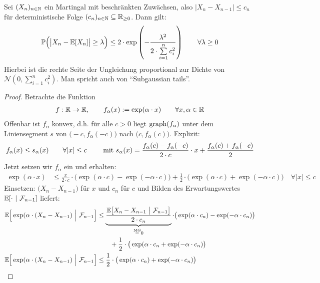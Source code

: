\begin{theorem}\label{theorem5.4AzumasUngleichung}\enter
Sei $(X_n)_{n\in\N}$ ein Martingal mit beschränkten Zuwächsen, also $\big|X_n-X_{n-1}\big|\leq c_n$ für deterministische Folge $(c_n)_{n\in\N}\subseteq\R_{\geq0}$. Dann gilt:
\begin{align*}
\P\Big(\big|X_n-\E[X_n]\big|\geq\lambda\Big)\leq2\cdot\exp\left(-\frac{\lambda^2}{2\cdot\sum\limits_{i=1}^n c_i^2}\right)\qquad\forall\lambda\geq0
\end{align*}
Hierbei ist die rechte Seite der Ungleichung proportional zur Dichte von $\mathcal{N}\left(0,\sum\limits_{i=1}^n c_i^2\right)$. Man spricht auch von ``Subgaussian tails''.
\end{theorem}
\begin{proof}
Betrachte die Funktion
\begin{align*}
f:\R\to\R,\qquad f_\alpha(x):=\exp(\alpha\cdot x)\qquad\forall x,\alpha\in\R
\end{align*}
Offenbar ist $f_\alpha$ konvex, d.h. für alle $c>0$ liegt $\graph(f_\alpha)$ unter dem Liniensegment $s$ von $\big(-c,f_\alpha(-c)\big)$ nach $\big(c,f_\alpha(c)\big)$. Explizit:
\begin{align*}
f_\alpha(x)\leq s_\alpha(x)\qquad\forall |x|\leq c\qquad\mit s_\alpha(x)=\frac{f_\alpha(c)-f_\alpha(-c)}{2\cdot c}\cdot x+\frac{f_\alpha(c)+f_\alpha(-c)}{2}
\end{align*}
Jetzt setzen wir $f_\alpha$ ein und erhalten:
\begin{align*}
\exp(\alpha\cdot x)
&\leq\frac{x}{2\cdot c}\cdot\big(\exp(\alpha\cdot c)-\exp(-\alpha\cdot c)\big)+\frac{1}{2}\cdot\big(\exp(\alpha\cdot c)+\exp(-\alpha\cdot c)\big)\quad\forall |x|\leq c
\end{align*}
Einsetzen: $\big(X_n-X_{n-1}\big)$ für $x$ und $c_n$ für $c$ und Bilden des Erwartungswertes $\E[\cdot~|~\F_{n-1}]$ liefert:
\begin{align*}
\E\Big[\exp(\alpha\cdot(X_n-X_{n-1})~\Big|~\F_{n-1}\Big]
&\leq
\underbrace{\frac{\E\big[X_n-X_{n-1}~\big|~\F_{n-1}\big]}{2\cdot c_n}}_{\stackeq{\text{MG}}0}\cdot\big(\exp(\alpha\cdot c_n)-\exp(-\alpha\cdot c_n)\big)\\
&\qquad+\frac{1}{2}\cdot\big(\exp(\alpha\cdot c_n+\exp(-\alpha\cdot c_n)\big)\\
\E\Big[\exp(\alpha\cdot(X_n-X_{n-1})~\Big|~\F_{n-1}\Big]
&\leq \frac{1}{2}\cdot\big(\exp(\alpha\cdot c_n)+\exp(-\alpha\cdot c_n)\big)\\

\end{align*}
\end{proof}
